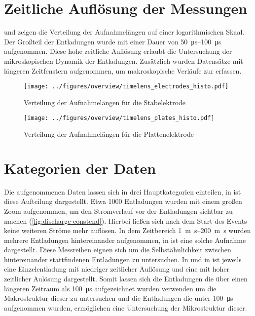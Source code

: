 \section{Zeitliche Auflösung der Messungen}
 und  zeigen die Verteilung der Aufnahmelängen auf einer logarithmischen Skaal. Der Großteil der Entladungen wurde mit einer Dauer von  \SIrange{50}{100}{\micro\second} aufgenommen. Diese hohe zeitliche Auflösung erlaubt die Untersuchung der mikroskopischen Dynamik der Entladungen. Zusätzlich wurden Datensätze mit längeren Zeitfenstern aufgenommen, um makroskopische Verläufe zur erfassen.


\begin{figure}[htbp]
    \centering
    \begin{minipage}[t]{0.47\textwidth}
        \centering
        \texttt{[image: ../figures/overview/timelens\_electrodes\_histo.pdf]}
        \caption{Verteilung der Aufnahmelängen für die Stabelektrode}
        \label{fig:histogram-timelen-stab}
    \end{minipage}
    \hfill
    \begin{minipage}[t]{0.47\textwidth}
        \centering
        \texttt{[image: ../figures/overview/timelens\_plates\_histo.pdf]}
        \caption{Verteilung der Aufnahmelängen für die Plattenelektrode}
        \label{fig:histogram-timelen-platte}
    \end{minipage}
\end{figure}

\section{Kategorien der Daten}

Die aufgenommenen Daten lassen sich in drei Hauptkategorien einteilen, in  ist diese Aufteilung dargestellt. Etwa 1000 Entladungen wurden mit einem großen Zoom aufgenommen, um den Stromverlauf vor der Entladungen sichtbar zu machen (\ref{fig:discharge-constend}). Hierbei ließen sich nach dem Start des Events keine weiteren Ströme mehr auflösen. 
In dem Zeitbereich \SIrange{1}{200}{\m\second} wurden mehrere Entladungen hintereinander aufgenommen, in  ist eine solche Aufnahme dargestellt. Diese Messreihen eignen sich um die Selbstähnlichkeit zwischen hintereinander stattfindenen Entladungen zu untersuchen. In  und in  ist jeweils eine Einzelentladung mit niedriger zeitlicher Auflösung und eine mit hoher zeitlicher Aulösung dargestellt. Somit lassen sich die Entladungen die über einen längeren Zeitraum als \SI{100}{\micro\second} aufgezeichnet wurden verwenden um die Makrostruktur dieser zu untersuchen und die Entladungen die unter \SI{100}{\micro\second} aufgenommen wurden, ermöglichen eine Untersuchung der Mikrostruktur dieser.


